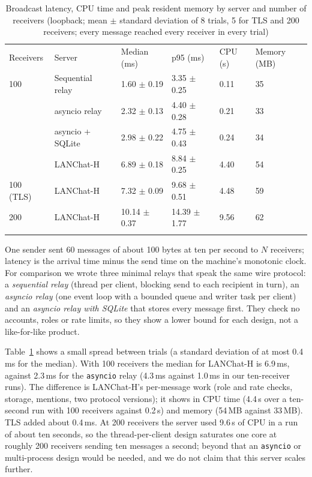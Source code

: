 \documentclass[graybox]{svmult}
\newcommand{\code}[1]{\texttt{#1}}
\newcommand{\lch}{\mbox{LANChat-H}}
\begin{document}
\begin{table}[!tb]
\caption{Broadcast latency, CPU time and peak resident memory by server and number of receivers (loopback; mean $\pm$ standard deviation of 8 trials, 5 for TLS and 200 receivers; every message reached every receiver in every trial)}
\label{tab:fanout}
\footnotesize
\setlength{\tabcolsep}{3pt}
\begin{tabular}{p{1.4cm}p{2.5cm}p{1.8cm}p{1.8cm}p{1.0cm}p{1.5cm}}
\svhline\noalign{\smallskip}
Receivers & Server & Median (ms) & p95 (ms) & CPU (s) & Memory (MB) \\
\noalign{\smallskip}\svhline\noalign{\smallskip}
100 & Sequential relay & 1.60 $\pm$ 0.19 & 3.35 $\pm$ 0.25 & 0.11 & 35 \\
 & asyncio relay & 2.32 $\pm$ 0.13 & 4.40 $\pm$ 0.28 & 0.21 & 33 \\
 & asyncio + SQLite & 2.98 $\pm$ 0.22 & 4.75 $\pm$ 0.43 & 0.24 & 34 \\
 & LANChat-H & 6.89 $\pm$ 0.18 & 8.84 $\pm$ 0.25 & 4.40 & 54 \\
\hline
100 (TLS) & LANChat-H & 7.32 $\pm$ 0.09 & 9.68 $\pm$ 0.51 & 4.48 & 59 \\
200 & LANChat-H & 10.14 $\pm$ 0.37 & 14.39 $\pm$ 1.77 & 9.56 & 62 \\
\noalign{\smallskip}\svhline\noalign{\smallskip}
\end{tabular}
\end{table}
One sender sent 60 messages of about 100 bytes at ten per second to $N$ receivers; latency is the arrival time minus the send time on the machine's monotonic clock. For comparison we wrote three minimal relays that speak the same wire protocol: a \emph{sequential relay} (thread per client, blocking send to each recipient in turn), an \emph{asyncio relay} (one event loop with a bounded queue and writer task per client) and an \emph{asyncio relay with SQLite} that stores every message first. They check no accounts, roles or rate limits, so they show a lower bound for each design, not a like-for-like product.


Table~\ref{tab:fanout} shows a small spread between trials (a standard deviation of at most 0.4\,ms for the median). With 100 receivers the median for \lch{} is 6.9\,ms, against 2.3\,ms for the \code{asyncio} relay (4.3\,ms against 1.0\,ms in our ten-receiver runs). The difference is \lch{}'s per-message work (role and rate checks, storage, mentions, two protocol versions); it shows in CPU time (4.4\,s over a ten-second run with 100 receivers against 0.2\,s) and memory (54\,MB against 33\,MB). TLS added about 0.4\,ms. At 200 receivers the server used 9.6\,s of CPU in a run of about ten seconds, so the thread-per-client design saturates one core at roughly 200 receivers sending ten messages a second; beyond that an \code{asyncio} or multi-process design would be needed, and we do not claim that this server scales further.
\end{document}
